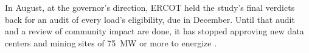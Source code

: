 In August, at the governor's direction, ERCOT held the study's final verdicts back for an audit of every load's eligibility, due in December. Until that audit and a review of community impact are done, it has stopped approving new data centers and mining sites of 75~MW or more to energize \autocite{ercot2026batchzero}. %

